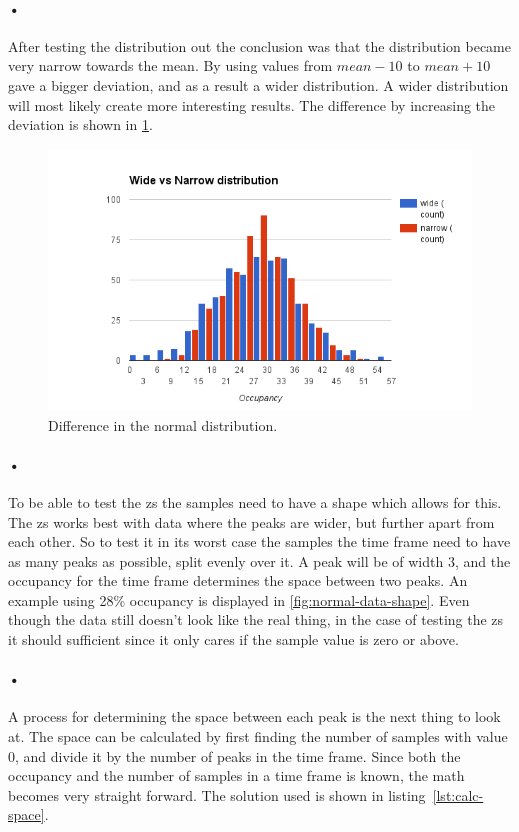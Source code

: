 \documentclass[a4paper, 12pt]{report}\dfrac{\right }{•}
\begin{document}
\paragraph{•}
After testing the distribution out the conclusion was that the distribution became very narrow towards the mean.
By using values from $mean-10$ to $mean+10$ gave a bigger deviation, and as a result a wider distribution.
A wider distribution will most likely create more interesting results.
The difference by increasing the deviation is shown in \ref{fig:distribution}.

\begin{figure}[h!]
	\centering
		\includegraphics[width=1.0\textwidth]{images/normal-dist-diff.png}
		\caption{Difference in the normal distribution.}
		\label{fig:distribution}
\end{figure}

\paragraph{•}
To be able to test the \gls{zs} the samples need to have a shape which allows for this.
The \gls{zs} works best with data where the peaks are wider, but further apart from each other.
So to test it in its worst case the samples the time frame need to have as many peaks as possible, split evenly over it.
A peak will be of width 3, and the occupancy for the time frame determines the space between two peaks.
An example using 28\% occupancy is displayed in \ref{fig:normal-data-shape}.
Even though the data still doesn't look like the real thing, in the case of testing the \gls{zs} it should sufficient since it only cares if the sample value is zero or above.

\paragraph{•}
A process for determining the space between each peak is the next thing to look at.
The space can be calculated by first finding the number of samples with value 0, and divide it by the number of peaks in the time frame.
Since both the occupancy and the number of samples in a time frame is known, the math becomes very straight forward.
The solution used is shown in listing~\ref{lst:calc-space}.
\end{document}
